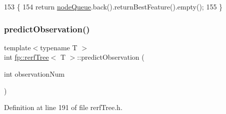 \begin{DoxyCode}
153                                               \{
154                     \textcolor{keywordflow}{return} \hyperlink{classfp_1_1rerfTree_a59b3bdcba86acbe93fd46658132218a8}{nodeQueue}.back().returnBestFeature().empty();
155                 \}
\end{DoxyCode}
\mbox{\label{classfp_1_1rerfTree_a254ba4e644b4ad419809868ac34f6a44}} 
\subsubsection{\texorpdfstring{predict\+Observation()}{predictObservation()}}
{\footnotesize\ttfamily template$<$typename T $>$ \\
int \hyperlink{classfp_1_1rerfTree}{fp\+::rerf\+Tree}$<$ T $>$\+::predict\+Observation (\begin{DoxyParamCaption}\item[{int}]{observation\+Num }\end{DoxyParamCaption})\hspace{0.3cm}{\ttfamily [inline]}}



Definition at line 191 of file rerf\+Tree.\+h.


